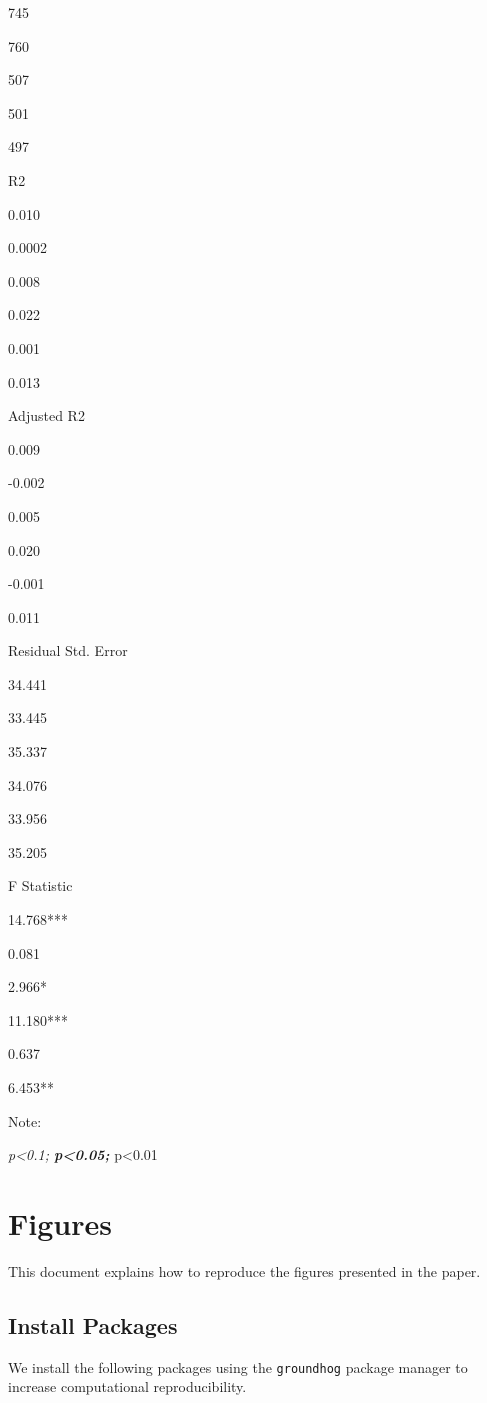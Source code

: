 \documentclass[
  a4paper,
  DIV=11,
  numbers=noendperiod]{scrreprt}
\begin{document}
745

760

507

501

497

R2

0.010

0.0002

0.008

0.022

0.001

0.013

Adjusted R2

0.009

-0.002

0.005

0.020

-0.001

0.011

Residual Std. Error

34.441

33.445

35.337

34.076

33.956

35.205

F Statistic

14.768***

0.081

2.966*

11.180***

0.637

6.453**

Note:

\emph{p\textless0.1; \textbf{p\textless0.05; }}p\textless0.01


\hypertarget{figures}{%
\chapter{Figures}\label{figures}}

This document explains how to reproduce the figures presented in the
paper.

\hypertarget{install-packages-2}{%
\section{Install Packages}\label{install-packages-2}}

We install the following packages using the \texttt{groundhog} package
manager to increase computational reproducibility.
\end{document}
